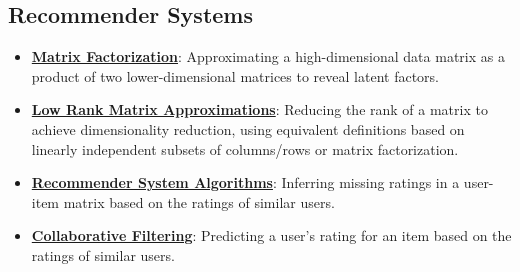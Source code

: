 \documentclass{article}%
\begin{document}
%
\subsection{Recommender Systems}%
\label{subsec:RecommenderSystems}%
\begin{itemize}[leftmargin=*]%
\item \href{https://purdue.brightspace.com/d2l/common/assets/pdfjs-d2l-dist/1.0.14-legacy/web/viewer.html?file=\%2Fcontent\%2Fenforced\%2F1095467-wl.202510.CS.24300.001\%2F11L2-svd-pca-recommender.pdf\%3Fou\%3D1095467\&lang=en-us\&container=d2l-fileviewer-rendered-pdf\&fullscreen=d2l-fileviewer-rendered-pdf-dialog\&height=667#page=13}{\textbf{Matrix Factorization}}: Approximating a high-dimensional data matrix as a product of two lower-dimensional matrices to reveal latent factors.%
\item \href{https://purdue.brightspace.com/d2l/common/assets/pdfjs-d2l-dist/1.0.14-legacy/web/viewer.html?file=\%2Fcontent\%2Fenforced\%2F1095467-wl.202510.CS.24300.001\%2F11L2-svd-pca-recommender.pdf\%3Fou\%3D1095467\&lang=en-us\&container=d2l-fileviewer-rendered-pdf\&fullscreen=d2l-fileviewer-rendered-pdf-dialog\&height=667#page=9}{\textbf{Low Rank Matrix Approximations}}: Reducing the rank of a matrix to achieve dimensionality reduction, using equivalent definitions based on linearly independent subsets of columns/rows or matrix factorization.%
\item \href{https://purdue.brightspace.com/d2l/common/assets/pdfjs-d2l-dist/1.0.14-legacy/web/viewer.html?file=\%2Fcontent\%2Fenforced\%2F1095467-wl.202510.CS.24300.001\%2F11L2-svd-pca-recommender.pdf\%3Fou\%3D1095467\&lang=en-us\&container=d2l-fileviewer-rendered-pdf\&fullscreen=d2l-fileviewer-rendered-pdf-dialog\&height=667#page=31}{\textbf{Recommender System Algorithms}}: Inferring missing ratings in a user-item matrix based on the ratings of similar users.%
\item \href{https://purdue.brightspace.com/d2l/common/assets/pdfjs-d2l-dist/1.0.14-legacy/web/viewer.html?file=\%2Fcontent\%2Fenforced\%2F1095467-wl.202510.CS.24300.001\%2F11L2-svd-pca-recommender.pdf\%3Fou\%3D1095467\&lang=en-us\&container=d2l-fileviewer-rendered-pdf\&fullscreen=d2l-fileviewer-rendered-pdf-dialog\&height=667#page=33}{\textbf{Collaborative Filtering}}: Predicting a user's rating for an item based on the ratings of similar users.%
\end{itemize}

%
\end{document}
